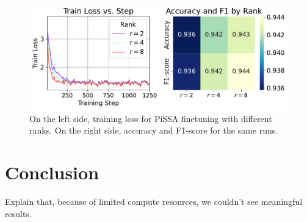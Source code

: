 \documentclass[a4paper,10pt,twocolumn,english]{article}
\begin{document}
\begin{figure}[ht]
    \centering
    \includegraphics[width=1\linewidth]{../plots/pissa_train_loss_vs_step_final_v3.pdf}
    \caption{On the left side, training loss for PiSSA finetuning with different ranks. On the right side, accuracy and F1-score for the same runs.}
    \label{fig:pissa}
\end{figure}

\section{Conclusion}
Explain that, because of limited compute resources, we couldn't see meaningful results.



\end{document}
